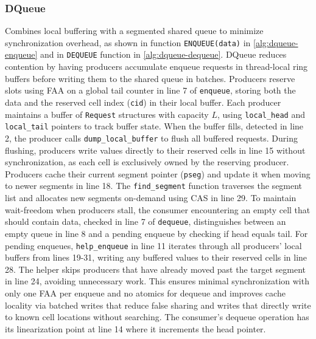 \subsubsection{DQueue}
Combines local buffering with a segmented shared queue to minimize synchronization overhead, as shown in function \texttt{ENQUEUE(data)} in \cref{alg:dqueue-enqueue} and in \texttt{DEQUEUE} function in \cref{alg:dqueue-dequeue}. DQueue reduces contention by having producers accumulate enqueue requests in thread-local ring buffers before writing them to the shared queue in batches. Producers reserve slots using \ac{FAA} on a global tail counter in line 7 of \texttt{enqueue}, storing both the data and the reserved cell index (\texttt{cid}) in their local buffer. Each producer maintains a buffer of \texttt{Request} structures with capacity $L$, using \texttt{local\_head} and \texttt{local\_tail} pointers to track buffer state. When the buffer fills, detected in line 2, the producer calls \texttt{dump\_local\_buffer} to flush all buffered requests. During flushing, producers write values directly to their reserved cells in line 15 without synchronization, as each cell is exclusively owned by the reserving producer. Producers cache their current segment pointer (\texttt{pseg}) and update it when moving to newer segments in line 18. The \texttt{find\_segment} function traverses the segment list and allocates new segments on-demand using \ac{CAS} in line 29. To maintain wait-freedom when producers stall, the consumer encountering an empty cell that should contain data, checked in line 7 of \texttt{dequeue}, distinguishes between an empty queue in line 8 and a pending enqueue by checking if head equals tail. For pending enqueues, \texttt{help\_enqueue} in line 11 iterates through all producers' local buffers from lines 19-31, writing any buffered values to their reserved cells in line 28. The helper skips producers that have already moved past the target segment in line 24, avoiding unnecessary work. This ensures minimal synchronization with only one \ac{FAA} per enqueue and no atomics for dequeue and improves cache locality via batched writes that reduce false sharing and writes that directly write to known cell locations without searching. The consumer's dequeue operation has its linearization point at line 14 where it increments the head pointer. \cite{WangCacheCoherent}

